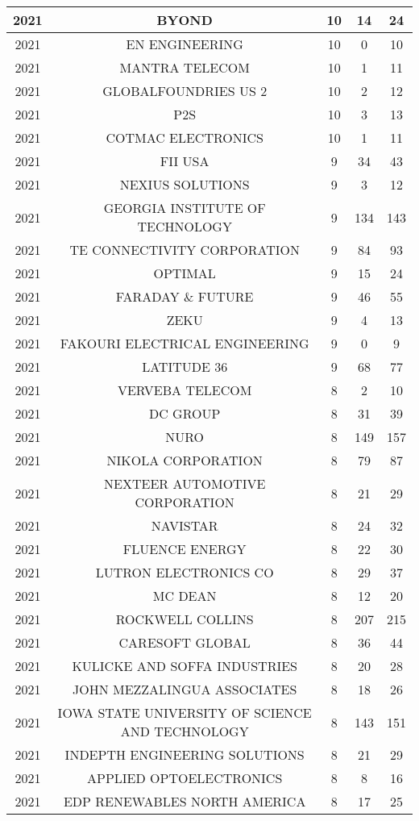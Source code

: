 \documentclass{article}%
\begin{document}
\begin{longtable}{c|c|c|c|c}
\hline%
2021&BYOND&10&14&24\\%
\hline%
2021&EN ENGINEERING&10&0&10\\%
\hline%
2021&MANTRA TELECOM&10&1&11\\%
\hline%
2021&GLOBALFOUNDRIES US 2&10&2&12\\%
\hline%
2021&P2S&10&3&13\\%
\hline%
2021&COTMAC ELECTRONICS&10&1&11\\%
\hline%
2021&FII USA&9&34&43\\%
\hline%
2021&NEXIUS SOLUTIONS&9&3&12\\%
\hline%
2021&GEORGIA INSTITUTE OF TECHNOLOGY&9&134&143\\%
\hline%
2021&TE CONNECTIVITY CORPORATION&9&84&93\\%
\hline%
2021&OPTIMAL&9&15&24\\%
\hline%
2021&FARADAY \& FUTURE&9&46&55\\%
\hline%
2021&ZEKU&9&4&13\\%
\hline%
2021&FAKOURI ELECTRICAL ENGINEERING&9&0&9\\%
\hline%
2021&LATITUDE 36&9&68&77\\%
\hline%
2021&VERVEBA TELECOM&8&2&10\\%
\hline%
2021&DC GROUP&8&31&39\\%
\hline%
2021&NURO&8&149&157\\%
\hline%
2021&NIKOLA CORPORATION&8&79&87\\%
\hline%
2021&NEXTEER AUTOMOTIVE CORPORATION&8&21&29\\%
\hline%
2021&NAVISTAR&8&24&32\\%
\hline%
2021&FLUENCE ENERGY&8&22&30\\%
\hline%
2021&LUTRON ELECTRONICS CO&8&29&37\\%
\hline%
2021&MC DEAN&8&12&20\\%
\hline%
2021&ROCKWELL COLLINS&8&207&215\\%
\hline%
2021&CARESOFT GLOBAL&8&36&44\\%
\hline%
2021&KULICKE AND SOFFA INDUSTRIES&8&20&28\\%
\hline%
2021&JOHN MEZZALINGUA ASSOCIATES&8&18&26\\%
\hline%
2021&IOWA STATE UNIVERSITY OF SCIENCE AND TECHNOLOGY&8&143&151\\%
\hline%
2021&INDEPTH ENGINEERING SOLUTIONS&8&21&29\\%
\hline%
2021&APPLIED OPTOELECTRONICS&8&8&16\\%
\hline%
2021&EDP RENEWABLES NORTH AMERICA&8&17&25\\%

\end{longtable}
\end{document}
